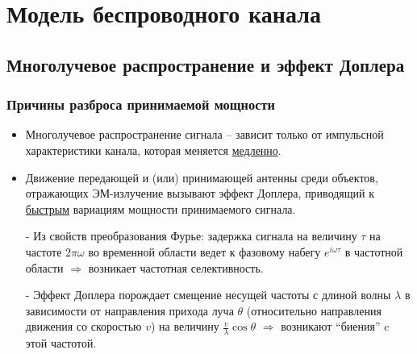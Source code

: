 \documentclass[utf8]{beamer}
\begin{document}
\section{Модель беспроводного канала}
\subsection{Многолучевое распространение и эффект Доплера}
\begin{frame}
\frametitle{Причины разброса принимаемой мощности}
\begin{itemize}
        \item Многолучевое распространение сигнала -- зависит только от импульсной характеристики канала, которая меняется \underline{медленно}.
        \item Движение передающей и (или) принимающей антенны среди объектов, отражающих ЭМ-излучение вызывают эффект Доплера, приводящий к \underline{быстрым} вариациям мощности принимаемого сигнала.
\end{itemize}
\small{
\begin{itemize}
        \item[-] Из свойств преобразования Фурье: задержка сигнала на величину $\tau$ на частоте $2\pi \omega$ во временной области ведет к фазовому набегу $e^{i\omega\tau}$ в частотной области $\Rightarrow$ возникает частотная селективность.
        \item[-] Эффект Доплера порождает смещение несущей частоты с длиной волны $\lambda$ в зависимости от направления прихода луча $\theta$ (относительно направления движения со скоростью $v$) на величину $\frac{v}{\lambda}\cos \theta$ $\Rightarrow$ возникают ``биения'' c этой частотой.
\end{itemize}
}
\end{frame}
\end{document}
